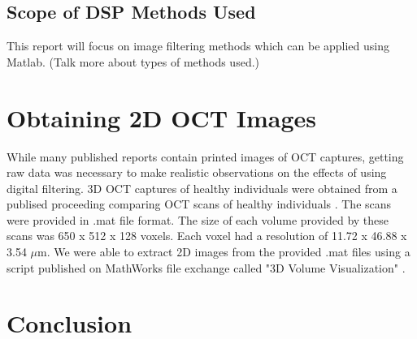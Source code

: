 \documentclass[%
reprint,
showpacs,preprintnumbers,
bibnotes,
amsmath,amssymb,
aps,
pra,
]{revtex4-1}
\begin{document}
	\subsection{\label{sec:level2} Scope of DSP Methods Used}
	This report will focus on image filtering methods which can be applied using Matlab.
	(Talk more about types of methods used.)

	\section{\label{sec:level1} Obtaining 2D OCT Images}
	While many published reports contain printed images of OCT captures, getting raw data was necessary to make realistic observations on the effects of using digital filtering. 3D OCT captures of healthy individuals were obtained from a publised proceeding comparing OCT scans of healthy individuals \cite{tahereh_2014}. The scans were provided in .mat file format. The size of each volume provided by these scans was 650 x 512 x 128 voxels. Each voxel had a resolution of 11.72 x 46.88 x 3.54 $\mu$m. We were able to extract 2D images from the provided .mat files using a script published on MathWorks file exchange called "3D Volume Visualization" \cite{stough}.

	\section{\label{sec:level1} Conclusion}





	
\end{document}
